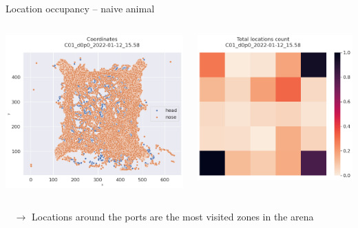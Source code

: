 \documentclass[bigger]{beamer}
\begin{document}
\begin{frame}[label={sec:org18c681a}]{Location occupancy -- naive animal}
\begin{columns}
\begin{column}{0.5\columnwidth}
\begin{center}
\includegraphics[width=.9\linewidth]{img/C01_d0p0_2022-01-12_15.58_coordinates.png}
\end{center}
\end{column}
\begin{column}{0.5\columnwidth}
\begin{center}
\includegraphics[width=.9\linewidth]{img/C01_d0p0_2022-01-12_15.58_locations_count.png}
\end{center}
\end{column}
\end{columns}
\begin{block}{~}
\(\to\) Locations around the ports are the most visited zones in the arena
\end{block}
\end{frame}
\end{document}
